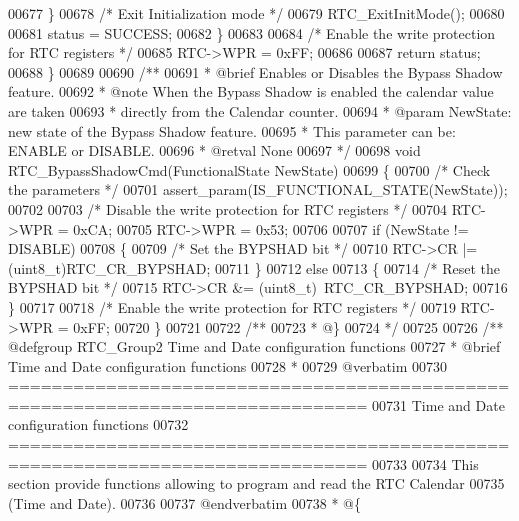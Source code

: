 \begin{DoxyCode}
00677     \}
00678     \textcolor{comment}{/* Exit Initialization mode */}
00679     RTC_ExitInitMode();
00680 
00681     status = SUCCESS;
00682   \}
00683 
00684   \textcolor{comment}{/* Enable the write protection for RTC registers */}
00685   RTC->WPR = 0xFF;
00686 
00687   \textcolor{keywordflow}{return} status;
00688 \}
00689 
00690 \textcolor{comment}{/**}
00691 \textcolor{comment}{  * @brief  Enables or Disables the Bypass Shadow feature.}
00692 \textcolor{comment}{  * @note   When the Bypass Shadow is enabled the calendar value are taken }
00693 \textcolor{comment}{  *         directly from the Calendar counter.}
00694 \textcolor{comment}{  * @param  NewState: new state of the Bypass Shadow feature.}
00695 \textcolor{comment}{  *         This parameter can be: ENABLE or DISABLE.}
00696 \textcolor{comment}{  * @retval None}
00697 \textcolor{comment}{*/}
00698 \textcolor{keywordtype}{void} RTC_BypassShadowCmd(FunctionalState NewState)
00699 \{
00700   \textcolor{comment}{/* Check the parameters */}
00701   assert_param(IS\_FUNCTIONAL\_STATE(NewState));
00702 
00703   \textcolor{comment}{/* Disable the write protection for RTC registers */}
00704   RTC->WPR = 0xCA;
00705   RTC->WPR = 0x53;
00706 
00707   \textcolor{keywordflow}{if} (NewState != DISABLE)
00708   \{
00709     \textcolor{comment}{/* Set the BYPSHAD bit */}
00710     RTC->CR |= (uint8\_t)RTC_CR_BYPSHAD;
00711   \}
00712   \textcolor{keywordflow}{else}
00713   \{
00714     \textcolor{comment}{/* Reset the BYPSHAD bit */}
00715     RTC->CR &= (uint8\_t)~RTC_CR_BYPSHAD;
00716   \}
00717 
00718   \textcolor{comment}{/* Enable the write protection for RTC registers */}
00719   RTC->WPR = 0xFF;
00720 \}
00721 
00722 \textcolor{comment}{/**}
00723 \textcolor{comment}{  * @\}}
00724 \textcolor{comment}{  */}
00725 
00726 \textcolor{comment}{/** @defgroup RTC\_Group2 Time and Date configuration functions}
00727 \textcolor{comment}{ *  @brief   Time and Date configuration functions }
00728 \textcolor{comment}{ *}
00729 \textcolor{comment}{@verbatim   }
00730 \textcolor{comment}{ ===============================================================================}
00731 \textcolor{comment}{                   Time and Date configuration functions}
00732 \textcolor{comment}{ ===============================================================================  }
00733 \textcolor{comment}{}
00734 \textcolor{comment}{  This section provide functions allowing to program and read the RTC Calendar}
00735 \textcolor{comment}{  (Time and Date).}
00736 \textcolor{comment}{}
00737 \textcolor{comment}{@endverbatim}
00738 \textcolor{comment}{  * @\{}

\end{DoxyCode}
